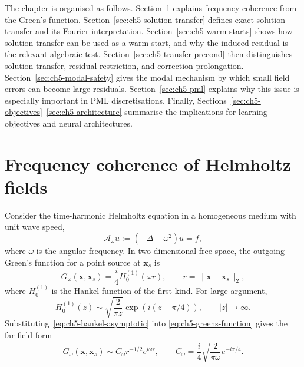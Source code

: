 The chapter is organised as follows.
Section~\ref{sec:ch5-frequency-coherence} explains frequency coherence from
the Green's function. Section~\ref{sec:ch5-solution-transfer} defines exact
solution transfer and its Fourier interpretation. Section~\ref{sec:ch5-warm-starts}
shows how solution transfer can be used as a warm start, and why the induced
residual is the relevant algebraic test. Section~\ref{sec:ch5-transfer-precond}
then distinguishes solution transfer, residual restriction, and correction
prolongation. Section~\ref{sec:ch5-modal-safety} gives the modal mechanism by
which small field errors can become large residuals. Section~\ref{sec:ch5-pml}
explains why this issue is especially important in PML discretisations.
Finally, Sections~\ref{sec:ch5-objectives}--\ref{sec:ch5-architecture}
summarise the implications for learning objectives and neural architectures.

\section{Frequency coherence of Helmholtz fields}
\label{sec:ch5-frequency-coherence}

Consider the time-harmonic Helmholtz equation in a homogeneous medium with
unit wave speed,
\begin{equation}
    \mathcal{A}_\omega u
    :=
    \left(-\Delta-\omega^2\right)u
    =
    f,
    \label{eq:ch5-continuous-helmholtz}
\end{equation}
where $\omega$ is the angular frequency. In two-dimensional free space, the
outgoing Green's function for a point source at $\mathbf{x}_s$ is
\begin{equation}
    G_\omega(\mathbf{x},\mathbf{x}_s)
    =
    \frac{i}{4}H_0^{(1)}(\omega r),
    \qquad
    r=\|\mathbf{x}-\mathbf{x}_s\|_2,
    \label{eq:ch5-greens-function}
\end{equation}
where $H_0^{(1)}$ is the Hankel function of the first kind. For large
argument,
\begin{equation}
    H_0^{(1)}(z)
    \sim
    \sqrt{\frac{2}{\pi z}}
    \exp\!\left(i(z-\pi/4)\right),
    \qquad |z|\to\infty.
    \label{eq:ch5-hankel-asymptotic}
\end{equation}
Substituting~\eqref{eq:ch5-hankel-asymptotic} into
\eqref{eq:ch5-greens-function} gives the far-field form
\begin{equation}
    G_\omega(\mathbf{x},\mathbf{x}_s)
    \sim
    C_\omega r^{-1/2}e^{i\omega r},
    \qquad
    C_\omega
    =
    \frac{i}{4}
    \sqrt{\frac{2}{\pi\omega}}
    e^{-i\pi/4}.
    \label{eq:ch5-green-far-field}
\end{equation}

